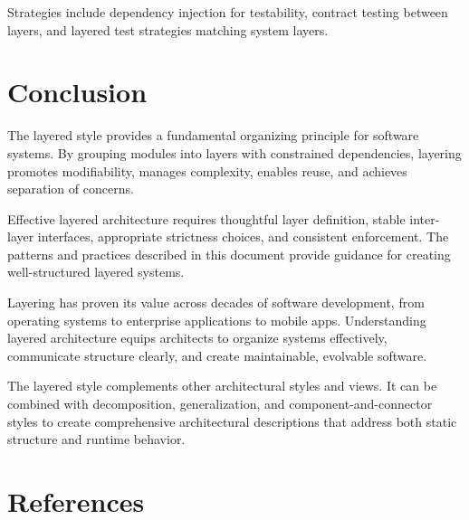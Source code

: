 \documentclass[11pt]{article}
\begin{document}
Strategies include dependency injection for testability, contract testing between layers, and layered test strategies matching system layers.

\section{Conclusion}

The layered style provides a fundamental organizing principle for software systems. By grouping modules into layers with constrained dependencies, layering promotes modifiability, manages complexity, enables reuse, and achieves separation of concerns.

Effective layered architecture requires thoughtful layer definition, stable inter-layer interfaces, appropriate strictness choices, and consistent enforcement. The patterns and practices described in this document provide guidance for creating well-structured layered systems.

Layering has proven its value across decades of software development, from operating systems to enterprise applications to mobile apps. Understanding layered architecture equips architects to organize systems effectively, communicate structure clearly, and create maintainable, evolvable software.

The layered style complements other architectural styles and views. It can be combined with decomposition, generalization, and component-and-connector styles to create comprehensive architectural descriptions that address both static structure and runtime behavior.

\section*{References}
\end{document}
